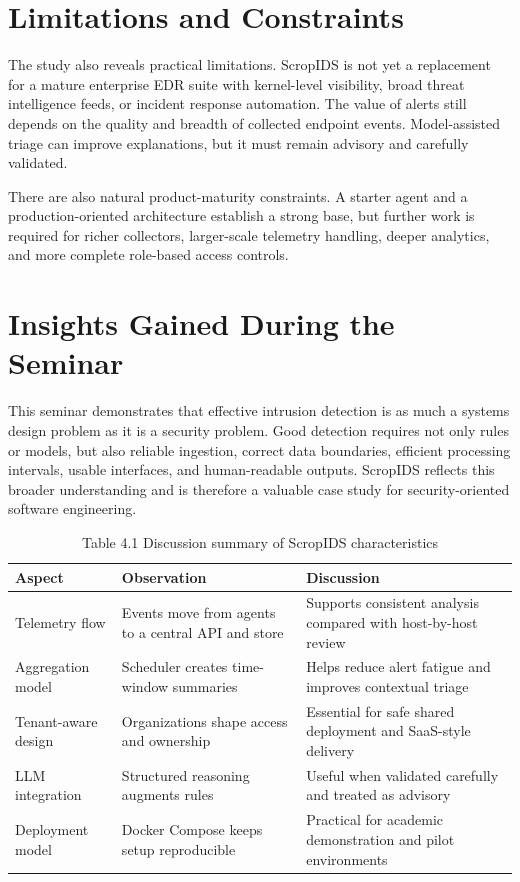 \documentclass[12pt,a4paper]{report}
\begin{document}
\section{Limitations and Constraints}
The study also reveals practical limitations. ScropIDS is not yet a replacement for a mature enterprise EDR suite with kernel-level visibility, broad threat intelligence feeds, or incident response automation. The value of alerts still depends on the quality and breadth of collected endpoint events. Model-assisted triage can improve explanations, but it must remain advisory and carefully validated.

There are also natural product-maturity constraints. A starter agent and a production-oriented architecture establish a strong base, but further work is required for richer collectors, larger-scale telemetry handling, deeper analytics, and more complete role-based access controls.

\section{Insights Gained During the Seminar}
This seminar demonstrates that effective intrusion detection is as much a systems design problem as it is a security problem. Good detection requires not only rules or models, but also reliable ingestion, correct data boundaries, efficient processing intervals, usable interfaces, and human-readable outputs. ScropIDS reflects this broader understanding and is therefore a valuable case study for security-oriented software engineering.

\begin{table}[H]
\centering
\caption{Table 4.1 Discussion summary of ScropIDS characteristics}
\begin{tabularx}{\textwidth}{>{\raggedright\arraybackslash}p{1.8in} X X}
\toprule
\textbf{Aspect} & \textbf{Observation} & \textbf{Discussion} \\
\midrule
Telemetry flow & Events move from agents to a central API and store & Supports consistent analysis compared with host-by-host review \\
Aggregation model & Scheduler creates time-window summaries & Helps reduce alert fatigue and improves contextual triage \\
Tenant-aware design & Organizations shape access and ownership & Essential for safe shared deployment and SaaS-style delivery \\
LLM integration & Structured reasoning augments rules & Useful when validated carefully and treated as advisory \\
Deployment model & Docker Compose keeps setup reproducible & Practical for academic demonstration and pilot environments \\
\bottomrule
\end{tabularx}
\end{table}
\end{document}
